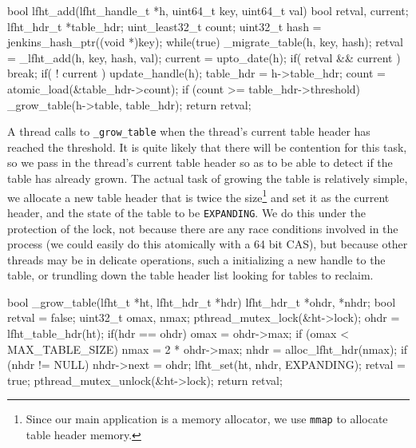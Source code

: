 \begin{center}
\begin{clisting}
bool lfht_add(lfht_handle_t *h, uint64_t key, uint64_t val){
  bool retval, current;
  lfht_hdr_t *table_hdr;
  uint_least32_t count;
  uint32_t hash = jenkins_hash_ptr((void *)key);
  while(true){
    _migrate_table(h, key, hash);
    retval = _lfht_add(h, key, hash, val);
    current = upto_date(h);
    if( retval && current ){ break; }
    if( ! current ){ update_handle(h); }
  }
  table_hdr = h->table_hdr;
  count = atomic_load(&table_hdr->count);
  if (count >= table_hdr->threshold){
    _grow_table(h->table, table_hdr);
  }
  return retval;
}

\end{clisting}
\end{center}


A thread calls to \texttt{\_grow\_table} when the thread's current table header has reached
the threshold. It is quite likely that there will be contention for this task, so 
we pass in the thread's current table header so as to be able to detect if the table
has already grown. The actual task of growing the table is relatively simple, we allocate
a new table header that is twice the size\footnote{Since our main application is a memory
allocator, we use \texttt{mmap} to allocate table header memory.}
and set it as the current header, and the state of the table to be \texttt{EXPANDING}.
We do this under the protection of the lock, not because there are any race conditions
involved in the process (we could easily do this atomically with a 64 bit CAS), but because
other threads may be in delicate operations, such a initializing a new handle to the table,
or trundling down the table header list looking for tables to reclaim.


\begin{center}
\begin{clisting}
bool _grow_table(lfht_t *ht,  lfht_hdr_t *hdr){
  lfht_hdr_t *ohdr, *nhdr;
  bool retval = false;
  uint32_t omax, nmax;
  pthread_mutex_lock(&ht->lock);
  ohdr = lfht_table_hdr(ht);
  if(hdr == ohdr){
    omax = ohdr->max;
    if (omax < MAX_TABLE_SIZE) {
      nmax = 2 * ohdr->max;
      nhdr  = alloc_lfht_hdr(nmax);
      if (nhdr != NULL){
	nhdr->next = ohdr;
	lfht_set(ht, nhdr, EXPANDING);
	retval = true;
      }
    }
  }
  pthread_mutex_unlock(&ht->lock);
  return retval;
}

\end{clisting}
\end{center}

